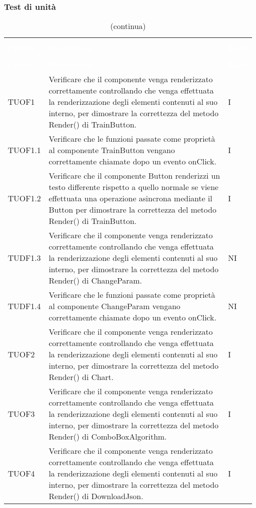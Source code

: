 \subsubsection{Test di unità}
\begin{longtable}{C{2cm} L{8cm} C{2cm}}
\caption{Tabella dei test di unità} \\
\textcolor{white}{\textbf{Codice}} &
\textcolor{white}{\textbf{Descrizione}} &
\textcolor{white}{\textbf{Esito}} \\
		\endfirsthead
		\caption[]{(continua)} \\
\textcolor{white}{\textbf{Codice}} &
\textcolor{white}{\textbf{Descrizione}} &
\textcolor{white}{\textbf{Esito}} \\
		\endhead
TUOF1 & Verificare che il componente venga renderizzato correttamente controllando che venga effettuata la renderizzazione degli elementi contenuti al suo interno, per dimostrare la correttezza del metodo Render() di TrainButton. & I \\
TUOF1.1 & Verificare che le funzioni passate come proprietà al componente TrainButton vengano correttamente chiamate dopo un evento onClick. & I \\
TUOF1.2 & Verificare che il componente Button renderizzi un testo differente rispetto a quello normale se viene effettuata una operazione asincrona mediante il Button per dimostrare la correttezza del metodo Render() di TrainButton. & I\\
TUDF1.3 & Verificare che il componente venga renderizzato correttamente controllando che venga effettuata la renderizzazione degli elementi contenuti al suo interno, per dimostrare la correttezza del metodo Render() di ChangeParam. & NI \\
TUDF1.4 & Verificare che le funzioni passate come proprietà al componente ChangeParam vengano correttamente chiamate dopo un evento onClick. & NI \\
TUOF2 & Verificare che il componente venga renderizzato correttamente controllando che venga effettuata la renderizzazione degli elementi contenuti al suo interno, per dimostrare la correttezza del metodo Render() di Chart. & I \\
TUOF3 & Verificare che il componente venga renderizzato correttamente controllando che venga effettuata la renderizzazione degli elementi contenuti al suo interno, per dimostrare la correttezza del metodo Render() di ComboBoxAlgorithm. & I \\
TUOF4 & Verificare che il componente venga renderizzato correttamente controllando che venga effettuata la renderizzazione degli elementi contenuti al suo interno, per dimostrare la correttezza del metodo Render() di DownloadJson. & I \\

\end{longtable}
